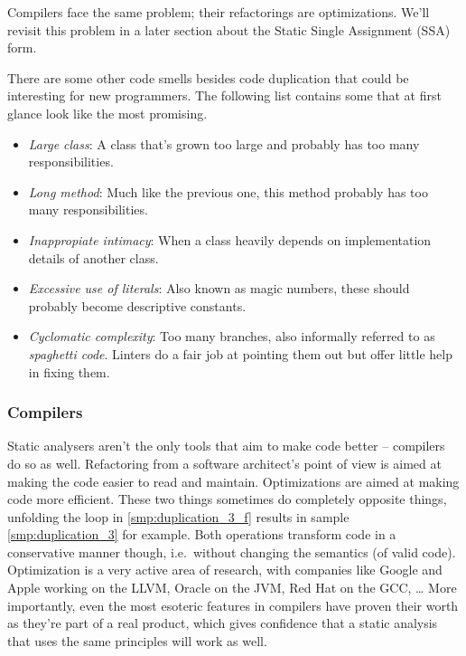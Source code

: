 \documentclass[]{article}
\providecommand{\tightlist}{%
  \setlength{\itemsep}{0pt}\setlength{\parskip}{0pt}}
\begin{document}
Compilers face the same problem; their refactorings are optimizations.
We'll revisit this problem in a later section about the Static Single
Assignment (SSA) form.

There are some other code smells besides code duplication that could be
interesting for new programmers. The following list contains some that
at first glance look like the most promising.

\begin{itemize}
\tightlist
\item
  \emph{Large class}: A class that's grown too large and probably has
  too many responsibilities.
\item
  \emph{Long method}: Much like the previous one, this method probably
  has too many responsibilities.
\item
  \emph{Inappropiate intimacy}: When a class heavily depends on
  implementation details of another class.
\item
  \emph{Excessive use of literals}: Also known as magic numbers, these
  should probably become descriptive constants.
\item
  \emph{Cyclomatic complexity}: Too many branches, also informally
  referred to as \emph{spaghetti code}. Linters do a fair job at
  pointing them out but offer little help in fixing them.
\end{itemize}

\subsubsection{Compilers}\label{compilers}

Static analysers aren't the only tools that aim to make code better --
compilers do so as well. Refactoring from a software architect's point
of view is aimed at making the code easier to read and maintain.
Optimizations are aimed at making code more efficient. These two things
sometimes do completely opposite things, unfolding the loop in
\ref{smp:duplication_3_f} results in sample \ref{smp:duplication_3} for
example. Both operations transform code in a conservative manner though,
i.e.~without changing the semantics (of valid code). Optimization is a
very active area of research, with companies like Google and Apple
working on the LLVM, Oracle on the JVM, Red Hat on the GCC, \ldots{}
More importantly, even the most esoteric features in compilers have
proven their worth as they're part of a real product, which gives
confidence that a static analysis that uses the same principles will
work as well.
\end{document}
